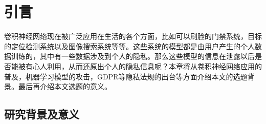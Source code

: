 
\chapter{引言}

卷积神经网络现在被广泛应用在生活的各个方面，比如可以刷脸的门禁系统，目标的定位检测系统以及图像搜索系统等等。这些系统的模型都是由用户产生的个人数据训练的，其中有一些数据涉及到个人的隐私。那么这些模型的信息在泄露以后是否能被有心人利用，从而还原出个人的隐私信息呢？本章将从卷积神经网络应用的普及，机器学习模型的攻击，GDPR等隐私法规的出台等方面介绍本文的选题背景。最后再介绍本文选题的意义。


\section{研究背景及意义}


